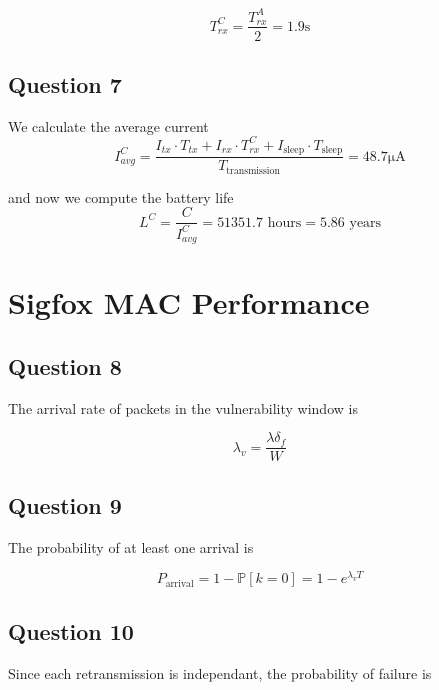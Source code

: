 \documentclass[]{article}
\begin{document}
	\begin{equation}
		T_{rx}^C = \frac{T_{rx}^A}{2} = 1.9 \mathrm{s}
	\end{equation}
	
	\subsection*{Question 7}
	
	We calculate the average current
	\begin{equation}
		I_{avg}^C = \frac{I_{tx} \cdot T_{tx} + I_{rx} \cdot T_{rx}^C + I_{\text{sleep}} \cdot T_{\text{sleep}}}{T_{\text{transmission}}} = 48.7\mathrm{\mu A}
	\end{equation}
	
	and now we compute the battery life
	\begin{equation}
		L^C = \frac{C}{I_{avg}^C} = 51351.7 \text{ hours} = 5.86 \text{ years}
	\end{equation}
	
	\section{Sigfox MAC Performance}
	
	\subsection*{Question 8}
	
	The arrival rate of packets in the vulnerability window is
	
	\begin{equation}
		\lambda_v = \frac{\lambda \delta_f}{W}
	\end{equation}
	
	\subsection*{Question 9}
	
	The probability of at least one arrival is 
	
	\begin{equation}
		P_{\text{arrival}} = 1 - \mathbb{P}[k = 0] = 1 - e^{\lambda_v T}
	\end{equation}
	
	\subsection*{Question 10}
	
	Since each retransmission is independant, the probability of failure is
	
\end{document}
